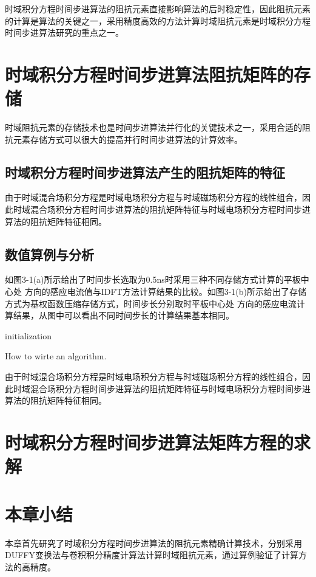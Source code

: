 \documentclass{standalone}
\begin{document}
时域积分方程时间步进算法的阻抗元素直接影响算法的后时稳定性，因此阻抗元素的计算是算法的关键之一，采用精度高效的方法计算时域阻抗元素是时域积分方程时间步进算法研究的重点之一。

\section{时域积分方程时间步进算法阻抗矩阵的存储}
时域阻抗元素的存储技术也是时间步进算法并行化的关键技术之一，采用合适的阻抗元素存储方式可以很大的提高并行时间步进算法的计算效率。

\subsection{时域积分方程时间步进算法产生的阻抗矩阵的特征}
由于时域混合场积分方程是时域电场积分方程与时域磁场积分方程的线性组合，因此时域混合场积分方程时间步进算法的阻抗矩阵特征与时域电场积分方程时间步进算法的阻抗矩阵特征相同。

\subsection{数值算例与分析}

如图3-1(a)所示给出了时间步长选取为0.5ns时采用三种不同存储方式计算的平板中心处 方向的感应电流值与IDFT方法计算结果的比较。如图3-1(b)所示给出了存储方式为基权函数压缩存储方式，时间步长分别取时平板中心处 方向的感应电流计算结果，从图中可以看出不同时间步长的计算结果基本相同。

\begin{algorithm}[H]
	initialization\;
\caption{How to wirte an algorithm.}
\end{algorithm}

由于时域混合场积分方程是时域电场积分方程与时域磁场积分方程的线性组合，因此时域混合场积分方程时间步进算法的阻抗矩阵特征与时域电场积分方程时间步进算法的阻抗矩阵特征相同。

\section{时域积分方程时间步进算法矩阵方程的求解}

\section{本章小结}
本章首先研究了时域积分方程时间步进算法的阻抗元素精确计算技术，分别采用DUFFY变换法与卷积积分精度计算法计算时域阻抗元素，通过算例验证了计算方法的高精度。
\end{document}
